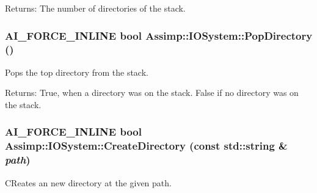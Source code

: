 \begin{Desc}
\item[Returns:]The number of directories of the stack. \end{Desc}
\hypertarget{class_assimp_1_1_i_o_system_a00f3ee1c44576364e8ce00206fb9dd2}{
\subsubsection[PopDirectory]{\setlength{\rightskip}{0pt plus 5cm}AI\_\-FORCE\_\-INLINE bool Assimp::IOSystem::PopDirectory ()}}
\label{class_assimp_1_1_i_o_system_a00f3ee1c44576364e8ce00206fb9dd2}


Pops the top directory from the stack. 

\begin{Desc}
\item[Returns:]True, when a directory was on the stack. False if no directory was on the stack. \end{Desc}
\hypertarget{class_assimp_1_1_i_o_system_3fc1316fdb4168cde052c95f96364d41}{
\subsubsection[CreateDirectory]{\setlength{\rightskip}{0pt plus 5cm}AI\_\-FORCE\_\-INLINE bool Assimp::IOSystem::CreateDirectory (const std::string \& {\em path})}}
\label{class_assimp_1_1_i_o_system_3fc1316fdb4168cde052c95f96364d41}


CReates an new directory at the given path. 

